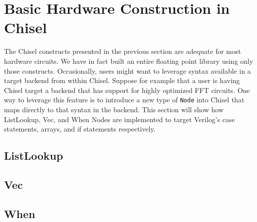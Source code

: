 \section{Basic Hardware Construction in Chisel}
The Chisel constructs presented in the previous section are adequate
for most hardware circuits. We have in fact built an entire floating
point library using only those constructs. Occasionally, users might
want to leverage syntax available in a target backend from within
Chisel. Suppose for example that a user is having Chisel target a
backend that has support for highly optimized FFT circuits. One way to
leverage this feature is to introduce a new type of {\tt Node} into
Chisel that maps directly to that syntax in the backend. This section
will show how ListLookup, Vec, and When Nodes are implemented to
target Verilog's case statements, arrays, and if statements
respectively.

\subsection{ListLookup}

\subsection{Vec}

\subsection{When}
